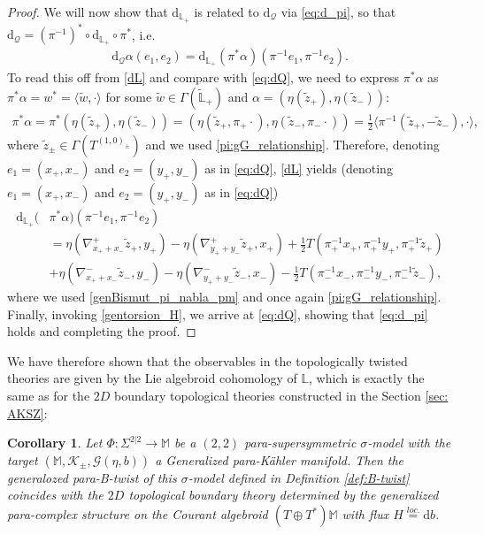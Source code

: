 \documentclass{article}
\newcommand{\TT}{{T\oplus T^*}}
\newcommand{\KK}{\mathcal{K}}
\newcommand{\GG}{\mathcal{G}}
\newcommand{\QQ}{\mathcal{Q}}
\newcommand{\ap}{\alpha}
\newcommand{\n}{\nabla}
\newcommand{\rd}{\mathrm{d}}
\newcommand{\Lb}{\mathbb{L}}
\newcommand{\se}{\Gamma}
\newcommand{\la}{\langle}
\newcommand{\ra}{\rangle}
\newcommand{\zt}{\tl{z}}
\newcommand{\Mb}{\mathbb{M}}
\def\tl{\tilde}
\newtheorem{corollary}[theorem]{Corollary}
\theoremstyle{definition}
\theoremstyle{remark}
\begin{document}
\begin{proof}
We will now show that $\rd_{\Lb_+}$ is related to $\rd_\QQ$ via \eqref{eq:d_pi}, so that $\rd_\QQ=(\pi^{-1})^*\circ \rd_{\Lb_+}\circ \pi^*$, i.e.
\begin{align*}
\rd_\QQ\ap(e_1,e_2)=\rd_{\Lb_+}(\pi^*\ap)(\pi^{-1}e_1,\pi^{-1}e_2).
\end{align*}
To read this off from \eqref{dL} and compare with \eqref{eq:dQ}, we need to express $\pi^*\ap$ as $\pi^*\ap=w^*=\la \tl{w},\cdot\ra$ for some $\tl{w}\in\se (\tl{\Lb}_+)$ and $\ap=(\eta(\zt_+),\eta(\zt_-))$:
\begin{align*}
\pi^*\ap=\pi^*(\eta(\zt_+),\eta(\zt_-))=(\eta(\zt_+,\pi_+\cdot),\eta(\zt_-,\pi_-\cdot))=\frac{1}{2}\la\pi^{-1}(\zt_+,-\zt_-),\cdot\ra,
\end{align*}
where $\zt_\pm\in \se(T^{(1,0)_\pm})$ and we used \eqref{pi:gG_relationship}. Therefore, denoting $e_1=(x_+,x_-)$ and $e_2=(y_+,y_-)$ as in \eqref{eq:dQ}, \eqref{dL} yields (denoting $e_1=(x_+,x_-)$ and $e_2=(y_+,y_-)$ as in \eqref{eq:dQ})
\begin{align*}
\rd_{\Lb_+}(&\pi^*\ap)(\pi^{-1}e_1,\pi^{-1}e_2)\\
&=\eta(\n^+_{x_++x_-}\zt_+,y_+)-\eta(\n^+_{y_++y_-}\zt_+,x_+)+\frac{1}{2}T(\pi_+^{-1}x_+,\pi_+^{-1}y_+,\pi_+^{-1}\zt_+)\\
&+\eta(\n^-_{x_++x_-}\zt_-,y_-)-\eta(\n^-_{y_++y_-}\zt_-,x_-)-\frac{1}{2}T(\pi_-^{-1}x_-,\pi_-^{-1}y_-,\pi_-^{-1}\zt_-),
\end{align*}
where we used \eqref{genBismut_pi_nabla_pm} and once again \eqref{pi:gG_relationship}. Finally, invoking \eqref{gentorsion_H}, we arrive at \eqref{eq:dQ}, showing that \eqref{eq:d_pi} holds and completing the proof.
\end{proof}

We have therefore shown that the observables in the topologically twisted theories are given by the Lie algebroid cohomology of $\Lb$, which is exactly the same as for the $2D$ boundary topological theories constructed in the Section \ref{sec: AKSZ}:

\begin{corollary}
Let $\Phi:\Sigma^{2|2}\rightarrow \Mb$ be a $(2,2)$ para-supersymmetric $\sigma$-model with the target $(\Mb,\KK_\pm,\GG(\eta,b))$ a Generalized para-K\"ahler manifold. Then the generalozed para-B-twist of this $\sigma$-model defined in Definition \ref{def:B-twist} coincides with the $2D$ topological boundary theory determined by the generalized para-complex structure on the Courant algebroid $(\TT)\Mb$ with flux $H\overset{loc.}{=}\rd b$.
\end{corollary}
\end{document}
